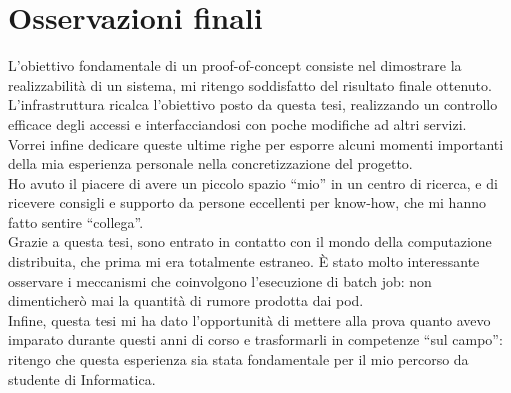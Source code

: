 \section{Osservazioni finali}
L'obiettivo fondamentale di un proof-of-concept consiste nel dimostrare la realizzabilità 
di un sistema, mi ritengo soddisfatto del risultato finale ottenuto. L'infrastruttura ricalca l'obiettivo 
posto da questa tesi, realizzando un controllo efficace degli accessi e interfacciandosi 
con poche modifiche ad altri servizi.  
\\Vorrei infine dedicare queste ultime righe per esporre alcuni momenti importanti della mia esperienza personale nella concretizzazione del progetto. 
\\ Ho avuto il piacere di avere un piccolo spazio “mio” in un centro di ricerca, e di ricevere consigli e supporto da persone eccellenti per know-how, che mi hanno fatto sentire “collega”.
\\ Grazie a questa tesi, sono entrato in contatto con il mondo della computazione distribuita, che prima mi era totalmente estraneo. 
È stato molto interessante osservare i meccanismi che coinvolgono l'esecuzione di batch job: non dimenticherò mai 
la quantità di rumore prodotta dai pod.   
\\ Infine, questa tesi mi ha dato l'opportunità di mettere alla prova quanto avevo
imparato durante questi anni di corso e trasformarli in competenze “sul campo”:
 ritengo che questa esperienza sia stata fondamentale per il mio percorso da studente di Informatica.  